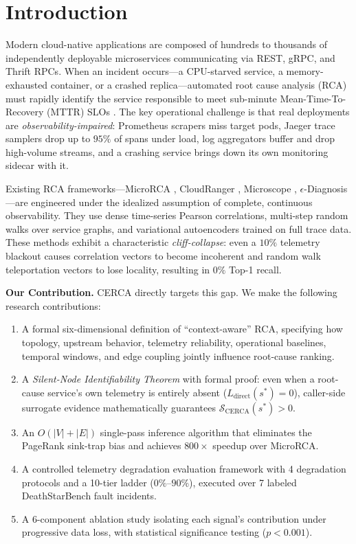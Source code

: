 \documentclass[conference]{IEEEtran}
\begin{document}
\section{Introduction}

Modern cloud-native applications are composed of hundreds to thousands of independently deployable microservices communicating via REST, gRPC, and Thrift RPCs. When an incident occurs---a CPU-starved service, a memory-exhausted container, or a crashed replica---automated root cause analysis (RCA) must rapidly identify the service responsible to meet sub-minute Mean-Time-To-Recovery (MTTR) SLOs \cite{chen2014}. The key operational challenge is that real deployments are \textit{observability-impaired}: Prometheus scrapers miss target pods, Jaeger trace samplers drop up to $95\%$ of spans under load, log aggregators buffer and drop high-volume streams, and a crashing service brings down its own monitoring sidecar with it.

Existing RCA frameworks---MicroRCA \cite{wu2020}, CloudRanger \cite{wang2018}, Microscope \cite{lin2018}, $\epsilon$-Diagnosis \cite{shan2019}---are engineered under the idealized assumption of complete, continuous observability. They use dense time-series Pearson correlations, multi-step random walks over service graphs, and variational autoencoders trained on full trace data. These methods exhibit a characteristic \textit{cliff-collapse}: even a $10\%$ telemetry blackout causes correlation vectors to become incoherent and random walk teleportation vectors to lose locality, resulting in $0\%$ Top-1 recall.

\textbf{Our Contribution.} CERCA directly targets this gap. We make the following research contributions:
\begin{enumerate}
    \item A formal six-dimensional definition of ``context-aware'' RCA, specifying how topology, upstream behavior, telemetry reliability, operational baselines, temporal windows, and edge coupling jointly influence root-cause ranking.
    \item A \textit{Silent-Node Identifiability Theorem} with formal proof: even when a root-cause service's own telemetry is entirely absent ($L_{\text{direct}}(s^*) = 0$), caller-side surrogate evidence mathematically guarantees $\mathcal{S}_{\text{CERCA}}(s^*) > 0$.
    \item An $O(|V|+|E|)$ single-pass inference algorithm that eliminates the PageRank sink-trap bias and achieves $800\times$ speedup over MicroRCA.
    \item A controlled telemetry degradation evaluation framework with 4 degradation protocols and a 10-tier ladder ($0\%$--$90\%$), executed over 7 labeled DeathStarBench fault incidents.
    \item A 6-component ablation study isolating each signal's contribution under progressive data loss, with statistical significance testing ($p < 0.001$).
\end{enumerate}
\end{document}
